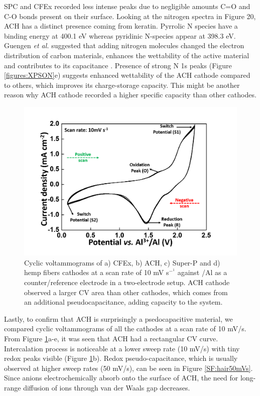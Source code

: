 SPC and CFEx recorded less intense peaks due to negligible amounts C=O and C-O bonds present on their surface.
Looking at the nitrogen spectra in Figure 20, ACH has a distinct presence coming from keratin. Pyrrolic N species have a binding energy at 400.1 eV whereas pyridinic N-species appear at 398.3 eV. Guengen \textit{et al.} suggested that adding nitrogen molecules changed the electron distribution of carbon materials, enhances the wettability of the active material and  contributes to its capacitance \cite{gueguen_xps_2016}. Presence of strong N 1s peaks (Figure \ref{figures:XPSON}e) suggests enhanced wettability of the ACH cathode compared to others, which improves its charge-storage capacity. This might be another reason why ACH cathode recorded a higher specific capacity than other cathodes. 
 \begin{figure}[tbh!]
  \centering
  \includegraphics[width=\textwidth]{figures/CV}
    \caption{Cyclic voltammograms of a) CFEx, b) ACH, c) Super-P and d) hemp fibers cathodes at a scan rate of 10 mV s$^-^1$ against /Al as a counter/reference electrode in a two-electrode setup. ACH cathode observed a larger CV area than other cathodes, which comes from an additional pseudocapacitance, adding capacity to the system.}
  \label{figures:CV}
\end{figure}
Lastly, to confirm that ACH is surprisingly a psedocapacitive material, we compared cyclic voltammograms of all the cathodes at a scan rate of 10 mV/s. From Figure \ref{figures:CV}a-e, it was seen that ACH had a rectangular CV curve. Intercalation process is noticeable at a lower sweep rate (10 mV/s) with tiny redox peaks visible (Figure \ref{figures:CV}b). Redox pseudo-capacitance, which is usually observed at higher sweep rates (50 mV/s), can be seen in Figure \ref{SF:hair50mVs}. Since  anions electrochemically absorb onto the surface of ACH, the  need for long-range diffusion of ions through van der Waals gap decreases. 

